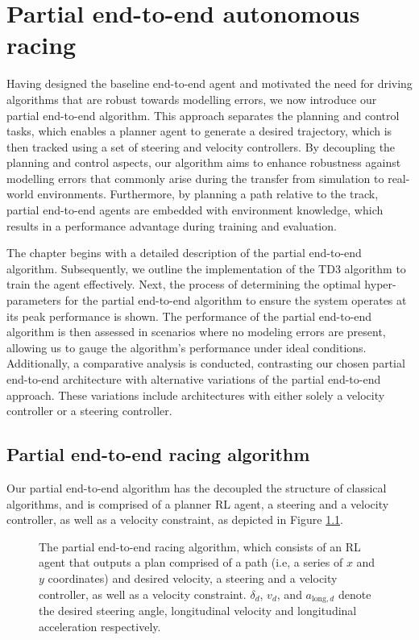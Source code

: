 \chapter{Partial end-to-end autonomous racing}
\label{chp:partial_end_to_end_autonomous_racing}

Having designed the baseline end-to-end agent and motivated the need for driving algorithms that are robust towards modelling errors, we now introduce our partial end-to-end algorithm.
This approach separates the planning and control tasks, which enables a planner agent to generate a desired trajectory, which is then tracked using a set of steering and velocity controllers.
By decoupling the planning and control aspects, our algorithm aims to enhance robustness against modelling errors that commonly arise during the transfer from simulation to real-world environments.
Furthermore, by planning a path relative to the track, partial end-to-end agents are embedded with environment knowledge, which results in a performance advantage during training and evaluation.


The chapter begins with a detailed description of the partial end-to-end algorithm.
Subsequently, we outline the implementation of the TD3 algorithm to train the agent effectively.
Next, the process of determining the optimal hyper-parameters for the partial end-to-end algorithm to ensure the system operates at its peak performance is shown. 
The performance of the partial end-to-end algorithm is then assessed in scenarios where no modeling errors are present, allowing us to gauge the algorithm's performance under ideal conditions. 
Additionally, a comparative analysis is conducted, contrasting our chosen partial end-to-end architecture with alternative variations of the partial end-to-end approach. 
These variations include architectures with either solely a velocity controller or a steering controller. 



\section{Partial end-to-end racing algorithm}

Our partial end-to-end algorithm has the decoupled the structure of classical algorithms, and is comprised of a planner RL agent, 
a steering and a velocity controller, as well as a velocity constraint, as depicted in Figure \ref{fig:steer_vel_architecture}.

\begin{figure}[htb!]
    \centering
    
    \caption[The partial end-to-end racing algorithm]{The partial end-to-end racing algorithm, which consists of an RL agent that outputs a plan comprised of a path (i.e, a series of $x$ and $y$ coordinates) and desired velocity, a steering and a velocity controller, as well as a velocity constraint. $\delta_{d}$, $v_{d}$, and $a_{\text{long},d}$ denote the desired steering angle, longitudinal velocity and longitudinal acceleration respectively.}
    \label{fig:steer_vel_architecture}
\end{figure}


